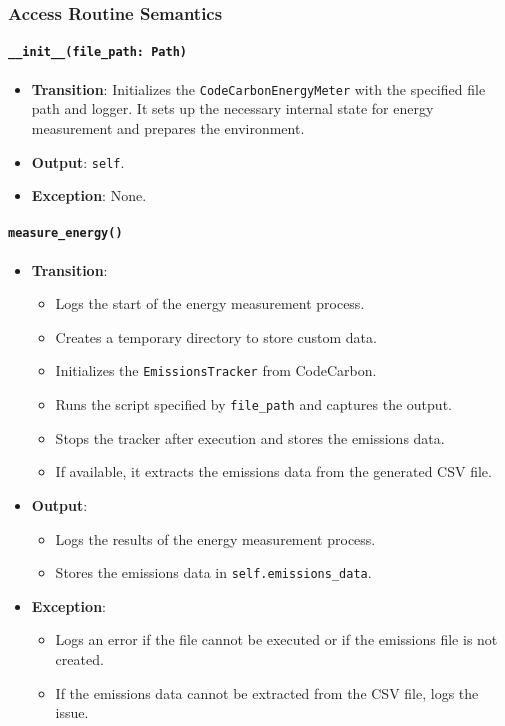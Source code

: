 \documentclass[12pt, titlepage]{article}
\begin{document}
\subsubsection{Access Routine Semantics}
\paragraph{\texttt{\_\_init\_\_(file\_path: Path)}}
\begin{itemize}
  \item \textbf{Transition}: Initializes the \texttt{CodeCarbonEnergyMeter} with the specified file path and logger. It sets up the necessary internal state for energy measurement and prepares the environment.
  \item \textbf{Output}: \texttt{self}.
  \item \textbf{Exception}: None.
\end{itemize}

\paragraph{\texttt{measure\_energy()}}
\begin{itemize}
  \item \textbf{Transition}:
    \begin{itemize}
      \item Logs the start of the energy measurement process.
      \item Creates a temporary directory to store custom data.
      \item Initializes the \texttt{EmissionsTracker} from CodeCarbon.
      \item Runs the script specified by \texttt{file\_path} and captures the output.
      \item Stops the tracker after execution and stores the emissions data.
      \item If available, it extracts the emissions data from the generated CSV file.
    \end{itemize}
  \item \textbf{Output}: 
    \begin{itemize}
        \item Logs the results of the energy measurement process.
        \item Stores the emissions data in \texttt{self.emissions\_data}.
    \end{itemize}
   \item \textbf{Exception}: 
      \begin{itemize}
        \item Logs an error if the file cannot be executed or if the emissions file is not created.
        \item If the emissions data cannot be extracted from the CSV file, logs the issue.
      \end{itemize}
 \end{itemize}
\end{document}
